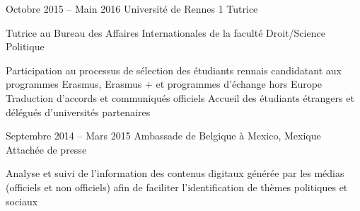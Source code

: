 \documentclass[30pt, french]{tccv}
\begin{document}
\begin{upshape}
\begin{competence}
\fontsize{10pt}{1.1em}\color{text}\bodyfontlight\upshape\selectfont %






\end{competence}




%
%


\begin{experience}

\vspace{0.5cm}
\item{\color{text} Octobre 2015 -- Main 2016}
     {Université de Rennes 1}
     {Tutrice}
     \fontsize{10pt}{1.1em}\color{text}\bodyfontlight\upshape\selectfont
     
 Tutrice au Bureau des Affaires Internationales de la faculté Droit/Science Politique \\
    \setlength{\parskip}{-10pt}
    \begin{itemize}
      \cvitem[\checkmark] Participation au processus de sélection des étudiants rennais candidatant aux programmes Erasmus, Erasmus + et programmes d’échange hors Europe
      \cvitem[\checkmark] Traduction d’accords et communiqués officiels
      \cvitem[\checkmark] Accueil des étudiants étrangers et délégués d’universités partenaires
    \end{itemize}     


\vspace{0.5cm}
\item{Septembre 2014 -- Mars 2015}
     {Ambassade de Belgique à Mexico, Mexique}
     {Attachée de presse}
     \fontsize{10pt}{1.1em}\color{text}\bodyfontlight\upshape\selectfont

 Analyse et suivi de l’information des contenus digitaux générée par les médias (officiels et non officiels) afin de faciliter l’identification de thèmes politiques et sociaux \\
\vspace{0.1cm}


\end{experience}
\end{upshape}
\end{document}
